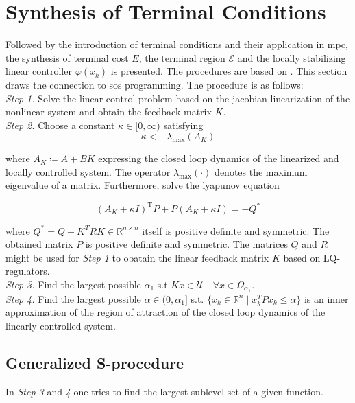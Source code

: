 \documentclass[10pt,a4paper]{article}
\begin{document}
\section{Synthesis of Terminal Conditions}
\label{sec:synTermCond}
Followed by the introduction of terminal conditions and their application in \gls{mpc}, the synthesis of terminal cost $E$, the
terminal region $\mathcal{E}$ and the locally stabilizing linear controller $\varphi(x_{k})$ is presented. The procedures are based
on \cite{CHEN19981205}. This section draws the connection to \gls{sos} programming. The procedure is as follows:\\

\textit{Step 1.} Solve the linear control problem based on the jacobian linearization of the nonlinear system and obtain the feedback
matrix $K$.\\

\textit{Step 2.} Choose a constant $\kappa \in [0,\infty)$ satisfying
\begin{equation}
	\kappa < -\lambda_{\text{max}}(A_K)
\end{equation}

where $A_K \coloneqq A + BK$ expressing the closed loop dynamics of the linearized and locally controlled system. The operator
$\lambda_{\text{max}}(\cdot)$ denotes the maximum eigenvalue of a matrix. Furthermore, solve the lyapunov equation

\begin{equation}
	\left(A_K+\kappa I\right)^{\mathrm{T}} P+P\left(A_K+\kappa I\right)=-Q^*
\end{equation}

where $Q^* = Q + K^T R K \in \mathbb{R}^{n \times n}$ itself is positive definite and symmetric. The obtained matrix $P$ is 
positive definite and symmetric. The matrices $Q$ and $R$ might be used for \textit{Step 1} to obatain the linear feedback
matrix $K$ based on LQ-regulators.\\

\textit{Step 3.} Find the largest possible $\alpha_1$ s.t $Kx \in \mathcal{U} \quad \forall x \in \Omega_{\alpha_1}$.\\

\textit{Step 4.} Find the largest possible $\alpha \in (0,\alpha_1]$ s.t. $\{x_k \in \mathbb{R}^n \mid x_k^TPx_k \leq \alpha \}$ is an 
inner approximation of the region of attraction of the closed loop dynamics of the linearly controlled system.

\subsection*{Generalized S-procedure}
In \textit{Step 3} and \textit{4} one tries to find the largest sublevel set of a given function. 
\end{document}
